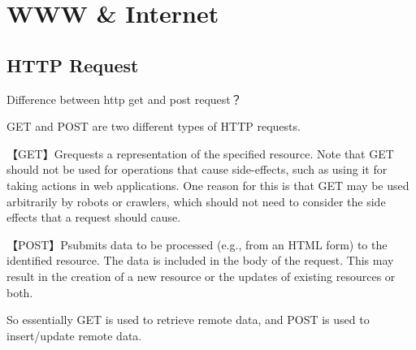 \chapter{WWW \& Internet}

\section{HTTP Request}
Difference between http get and post request？


GET and POST are two different types of HTTP requests.

【GET】Grequests a representation of the specified resource. Note that GET should not be used for operations that cause side-effects, such as using it for taking actions in web 
applications. One reason for this is that GET may be used arbitrarily by robots or crawlers, which should not need to consider the side effects that a request should cause.

【POST】Psubmits data to be processed (e.g., from an HTML form) to the identified resource. The data is included in the body of the request. This may result in the creation of a new 
resource or the updates of existing resources or both.

So essentially GET is used to retrieve remote data, and POST is used to insert/update remote data.